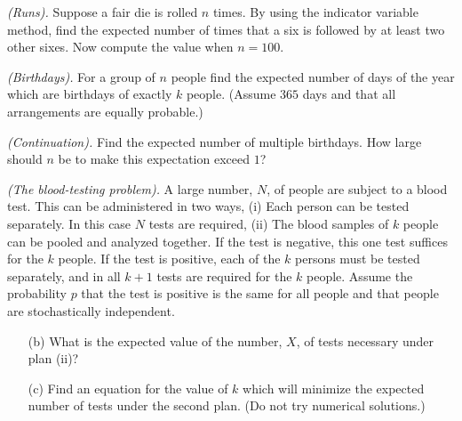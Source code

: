 \begin{problem}[Handout 6, \# 9]
  \emph{(Runs).} Suppose a fair die is rolled \(n\) times. By using the
  indicator variable method, find the expected number of times that a six
  is followed by at least two other sixes. Now compute the value when
  \(n=100\).
\end{problem}
\begin{solution}

\end{solution}
\newpage

\begin{problem}[Handout 6, \# 10]
  \emph{(Birthdays).} For a group of \(n\) people find the expected number
  of days of the year which are birthdays of exactly \(k\) people. (Assume
  \(365\) days and that all arrangements are equally probable.)
\end{problem}
\begin{solution}

\end{solution}
\newpage

\begin{problem}[Handout 6, \# 11]
  \emph{(Continuation).} Find the expected number of multiple
  birthdays. How large should \(n\) be to make this expectation exceed
  \(1\)?
\end{problem}
\begin{solution}

\end{solution}
\newpage

\begin{problem}[Handout 6, \# 12]
  \emph{(The blood-testing problem).} A large number, \(N\), of people are
  subject to a blood test. This can be administered in two ways, (i) Each
  person can be tested separately. In this case \(N\) tests are required,
  (ii) The blood samples of \(k\) people can be pooled and analyzed
  together. If the test is negative, this one test suffices for the \(k\)
  people. If the test is positive, each of the \(k\) persons must be tested
  separately, and in all \(k+1\) tests are required for the \(k\)
  people. Assume the probability \(p\) that the test is positive is the
  same for all people and that people are stochastically independent.
  \begin{itemize}[noitemsep]
  \item[(b)] What is the expected value of the number, \(X\), of tests
    necessary under plan (ii)?
  \item[(c)] Find an equation for the value of \(k\) which will minimize
    the expected number of tests under the second plan. (Do not try
    numerical solutions.)
  \end{itemize}
  \end{problem}
\begin{solution}

\end{solution}
\newpage

